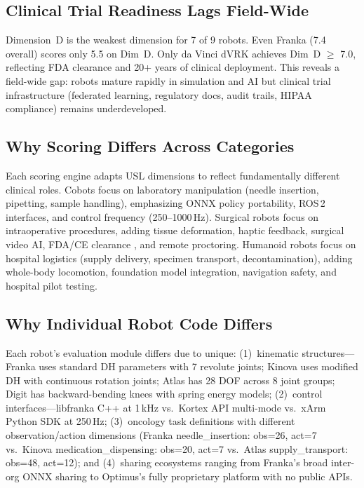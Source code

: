 \subsection{Clinical Trial Readiness Lags Field-Wide}
Dimension~D is the weakest dimension for 7 of 9 robots. Even Franka (7.4 overall) scores only 5.5 on Dim~D. Only da Vinci dVRK achieves Dim~D $\geq$ 7.0, reflecting FDA clearance and 20+ years of clinical deployment. This reveals a field-wide gap: robots mature rapidly in simulation and AI but clinical trial infrastructure (federated learning, regulatory docs, audit trails, HIPAA compliance) remains underdeveloped.

\subsection{Why Scoring Differs Across Categories}
Each scoring engine adapts USL dimensions to reflect fundamentally different clinical roles. Cobots focus on laboratory manipulation (needle insertion, pipetting, sample handling), emphasizing ONNX policy portability, ROS\,2 interfaces, and control frequency (250--1000\,Hz). Surgical robots focus on intraoperative procedures, adding tissue deformation, haptic feedback, surgical video AI, FDA/CE clearance \cite{fda2025aiml}, and remote proctoring. Humanoid robots focus on hospital logistics (supply delivery, specimen transport, decontamination), adding whole-body locomotion, foundation model integration, navigation safety, and hospital pilot testing.

\subsection{Why Individual Robot Code Differs}
Each robot's evaluation module differs due to unique: (1)~kinematic structures---Franka uses standard DH parameters with 7 revolute joints; Kinova uses modified DH with continuous rotation joints; Atlas has 28 DOF across 8 joint groups; Digit has backward-bending knees with spring energy models; (2)~control interfaces---libfranka C++ at 1\,kHz vs.\ Kortex API multi-mode vs.\ xArm Python SDK at 250\,Hz; (3)~oncology task definitions with different observation/action dimensions (Franka needle\_insertion: obs=26, act=7 vs.\ Kinova medication\_dispensing: obs=20, act=7 vs.\ Atlas supply\_transport: obs=48, act=12); and (4)~sharing ecosystems ranging from Franka's broad inter-org ONNX sharing to Optimus's fully proprietary platform with no public APIs.

